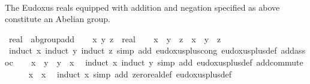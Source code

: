 \begin{isabellebody}
%
\isadelimproof
\isanewline
%
\endisadelimproof
\isanewline
{}\isamarkupfalse%
%
\isadelimproof
\ %
\endisadelimproof
%
\isatagproof
\isacommand{{\isachardot}{\kern0pt}{\isachardot}{\kern0pt}}\isamarkupfalse%
%
\endisatagproof
{\isafoldproof}%
%
\isadelimproof
%
\endisadelimproof
\isanewline
{}\isamarkupfalse%
%
\begin{isamarkuptext}%
The Eudoxus reals equipped with addition and negation specified as above constitute an Abelian group.%
\end{isamarkuptext}\isamarkuptrue%
\isamarkupfalse%
\ real\ {\isacharcolon}{\kern0pt}{\isacharcolon}{\kern0pt}\ ab{\isacharunderscore}{\kern0pt}group{\isacharunderscore}{\kern0pt}add\isanewline
%
\isadelimproof
%
\endisadelimproof
%
\isatagproof
{}\isamarkupfalse%
\isanewline
\ \ \isamarkupfalse%
\ x\ y\ z\ {\isacharcolon}{\kern0pt}{\isacharcolon}{\kern0pt}\ real\isanewline
\ \ \isamarkupfalse%
\ {\isachardoublequoteopen}x\ {\isacharplus}{\kern0pt}\ y\ {\isacharplus}{\kern0pt}\ z\ {\isacharequal}{\kern0pt}\ x\ {\isacharplus}{\kern0pt}\ {\isacharparenleft}{\kern0pt}y\ {\isacharplus}{\kern0pt}\ z{\isacharparenright}{\kern0pt}{\isachardoublequoteclose}\ \isamarkupfalse%
\ {\isacharparenleft}{\kern0pt}induct\ x{\isacharcomma}{\kern0pt}\ induct\ y{\isacharcomma}{\kern0pt}\ induct\ z{\isacharparenright}{\kern0pt}\ {\isacharparenleft}{\kern0pt}simp\ add{\isacharcolon}{\kern0pt}\ eudoxus{\isacharunderscore}{\kern0pt}plus{\isacharunderscore}{\kern0pt}cong\ eudoxus{\isacharunderscore}{\kern0pt}plus{\isacharunderscore}{\kern0pt}def\ add{\isachardot}{\kern0pt}assoc{\isacharparenright}{\kern0pt}\isanewline
\ \ \isamarkupfalse%
\ {\isachardoublequoteopen}x\ {\isacharplus}{\kern0pt}\ y\ {\isacharequal}{\kern0pt}\ y\ {\isacharplus}{\kern0pt}\ x{\isachardoublequoteclose}\ \isamarkupfalse%
\ {\isacharparenleft}{\kern0pt}induct\ x{\isacharcomma}{\kern0pt}\ induct\ y{\isacharparenright}{\kern0pt}\ {\isacharparenleft}{\kern0pt}simp\ add{\isacharcolon}{\kern0pt}\ eudoxus{\isacharunderscore}{\kern0pt}plus{\isacharunderscore}{\kern0pt}def\ add{\isachardot}{\kern0pt}commute{\isacharparenright}{\kern0pt}\isanewline
\ \ \isamarkupfalse%
\ {\isachardoublequoteopen}{}\ {\isacharplus}{\kern0pt}\ x\ {\isacharequal}{\kern0pt}\ x{\isachardoublequoteclose}\ \isamarkupfalse%
\ {\isacharparenleft}{\kern0pt}induct\ x{\isacharparenright}{\kern0pt}\ {\isacharparenleft}{\kern0pt}simp\ add{\isacharcolon}{\kern0pt}\ zero{\isacharunderscore}{\kern0pt}real{\isacharunderscore}{\kern0pt}def\ eudoxus{\isacharunderscore}{\kern0pt}plus{\isacharunderscore}{\kern0pt}def{\isacharparenright}{\kern0pt}\isanewline

\end{isabellebody}
